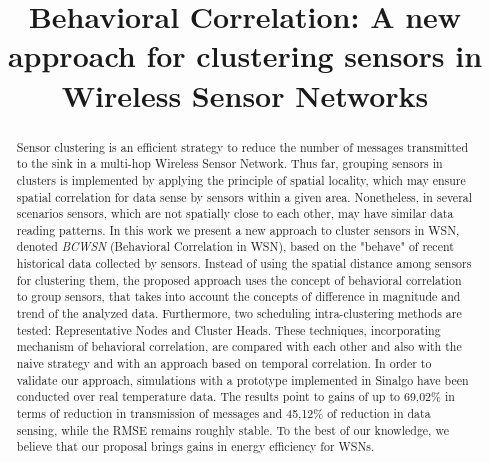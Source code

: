 \documentclass[conference]{IEEEtran}
\begin{document}
%

\title{Behavioral Correlation: A new approach for clustering sensors in Wireless Sensor Networks}

\author{
\and
{}
\and
{}
}


\maketitle


\begin{abstract}

Sensor clustering is an efficient strategy to reduce the number of messages
transmitted to the sink in a multi-hop Wireless Sensor Network. Thus far,
grouping sensors in clusters is implemented by applying the principle of spatial
locality, which may ensure spatial correlation for data sense by sensors within
a given area. Nonetheless, in several scenarios sensors, which are not spatially
close to each other, may have similar data reading patterns.
In this work we present a new approach to cluster sensors in WSN, denoted {\it
BCWSN} (Behavioral Correlation in WSN), based on the "behave" of recent
historical data collected by sensors. Instead of using the spatial distance
among sensors for clustering them, the proposed approach uses the concept of
behavioral correlation to group sensors, that takes into account the concepts of
difference in magnitude and trend of the analyzed data.
Furthermore, two scheduling intra-clustering methods are tested: Representative
Nodes and Cluster Heads. These techniques, incorporating mechanism of behavioral
correlation, are compared with each other and also with the naive strategy and
with an approach based on temporal correlation.
In order to validate our approach, simulations with a prototype implemented in
Sinalgo have been conducted over real temperature data. The results point to
gains of up to 69,02\% in terms of reduction in transmission of messages and
45,12\% of reduction in data sensing, while the RMSE remains roughly stable. To
the best of our knowledge, we believe that our proposal brings gains in energy
efficiency for WSNs.


\end{abstract}
\end{document}
